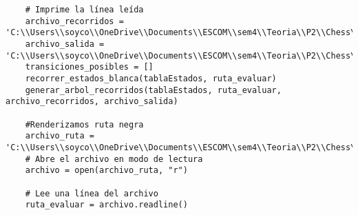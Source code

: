 \begin{enumerate}
\begin{lstlisting}
    # Imprime la línea leída
    archivo_recorridos = 'C:\\Users\\soyco\\OneDrive\\Documents\\ESCOM\\sem4\\Teoria\\P2\\Chess\\output\\recorridos_blanca.txt'
    archivo_salida = 'C:\\Users\\soyco\\OneDrive\\Documents\\ESCOM\\sem4\\Teoria\\P2\\Chess\\output\\arbol_blanca.dot'
    transiciones_posibles = []
    recorrer_estados_blanca(tablaEstados, ruta_evaluar)
    generar_arbol_recorridos(tablaEstados, ruta_evaluar, archivo_recorridos, archivo_salida)
    
    #Renderizamos ruta negra
    archivo_ruta = 'C:\\Users\\soyco\\OneDrive\\Documents\\ESCOM\\sem4\\Teoria\\P2\\Chess\\output\\ruta_negra.txt'
    # Abre el archivo en modo de lectura
    archivo = open(archivo_ruta, "r")

    # Lee una línea del archivo
    ruta_evaluar = archivo.readline()


\end{lstlisting}
\end{enumerate}
